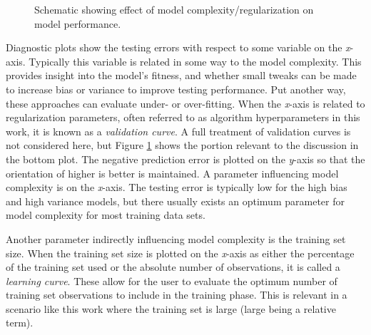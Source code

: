 \begin{figure}[!htb]
  \centering
  \caption{Schematic showing effect of model complexity/regularization on model 
           performance.}
  \label{fig:complex}
\end{figure}

Diagnostic plots show the testing errors with respect to some variable on the
\textit{x}-axis.  Typically this variable is related in some way to the model
complexity. This provides insight into the model's fitness, and whether small
tweaks can be made to increase bias or variance to improve testing performance.
Put another way, these approaches can evaluate under- or over-fitting.  When
the \textit{x}-axis is related to regularization parameters, often referred to
as algorithm hyperparameters in this work, it is known as a \textit{validation
curve}. A full treatment of validation curves is not considered here, but
Figure \ref{fig:complex} shows the portion relevant to the discussion in the
bottom plot.  The negative prediction error is plotted on the \textit{y}-axis
so that the orientation of higher is better is maintained.  A parameter
influencing model complexity is on the \textit{x}-axis.  The testing error is
typically low for the high bias and high variance models, but there usually
exists an optimum parameter for model complexity for most training data sets. 

Another parameter indirectly influencing model complexity is the training set
size.  When the training set size is plotted on the \textit{x}-axis as either
the percentage of the training set used or the absolute number of observations,
it is called a \textit{learning curve}.  These allow for the user to evaluate
the optimum number of training set observations to include in the training
phase.  This is relevant in a scenario like this work where the training set is
large (large being a relative term).  

